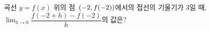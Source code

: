 곡선 $y=f(x)$ 위의 점~$(-2{,}\mkern3mu\mathopen{}f(-2))$에서의 접선의 기울기가 $3$일 때, $\displaystyle\lim_{h\to 0}\dfrac{f(-2+h)-f(-2)}{h}$의 값은?
